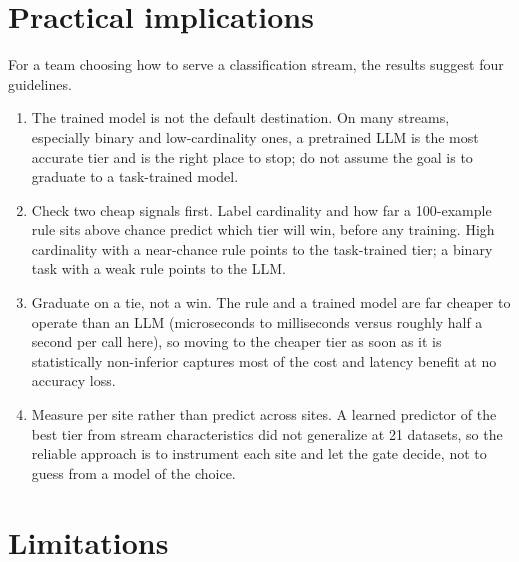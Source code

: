\section{Practical implications}\label{practical-implications}

For a team choosing how to serve a classification stream, the results
suggest four guidelines.

\begin{enumerate}
\def\labelenumi{\arabic{enumi}.}
\tightlist
\item
  The trained model is not the default destination. On many streams,
  especially binary and low-cardinality ones, a pretrained LLM is the
  most accurate tier and is the right place to stop; do not assume the
  goal is to graduate to a task-trained model.
\item
  Check two cheap signals first. Label cardinality and how far a
  100-example rule sits above chance predict which tier will win, before
  any training. High cardinality with a near-chance rule points to the
  task-trained tier; a binary task with a weak rule points to the LLM.
\item
  Graduate on a tie, not a win. The rule and a trained model are far
  cheaper to operate than an LLM (microseconds to milliseconds versus
  roughly half a second per call here), so moving to the cheaper tier as
  soon as it is statistically non-inferior captures most of the cost and
  latency benefit at no accuracy loss.
\item
  Measure per site rather than predict across sites. A learned predictor
  of the best tier from stream characteristics did not generalize at 21
  datasets, so the reliable approach is to instrument each site and let
  the gate decide, not to guess from a model of the choice.
\end{enumerate}

\section{Limitations}\label{limitations}

